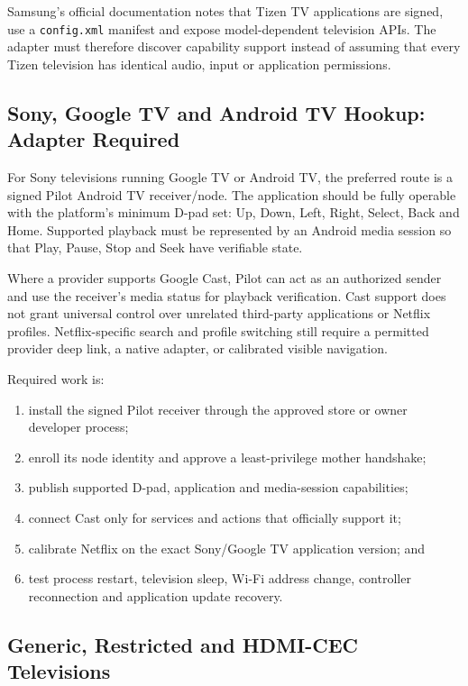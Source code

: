 Samsung's official documentation notes that Tizen TV applications are signed,
use a \texttt{config.xml} manifest and expose model-dependent television APIs.
The adapter must therefore discover capability support instead of assuming that
every Tizen television has identical audio, input or application permissions.

\subsection{Sony, Google TV and Android TV Hookup: Adapter Required}

For Sony televisions running Google TV or Android TV, the preferred route is a
signed Pilot Android TV receiver/node. The application should be fully operable
with the platform's minimum D-pad set: Up, Down, Left, Right, Select, Back and
Home. Supported playback must be represented by an Android media session so that
Play, Pause, Stop and Seek have verifiable state.

Where a provider supports Google Cast, Pilot can act as an authorized sender and
use the receiver's media status for playback verification. Cast support does not
grant universal control over unrelated third-party applications or Netflix
profiles. Netflix-specific search and profile switching still require a
permitted provider deep link, a native adapter, or calibrated visible navigation.

Required work is:

\begin{enumerate}
  \item install the signed Pilot receiver through the approved store or owner
        developer process;
  \item enroll its node identity and approve a least-privilege mother handshake;
  \item publish supported D-pad, application and media-session capabilities;
  \item connect Cast only for services and actions that officially support it;
  \item calibrate Netflix on the exact Sony/Google TV application version; and
  \item test process restart, television sleep, Wi-Fi address change, controller
        reconnection and application update recovery.
\end{enumerate}

\subsection{Generic, Restricted and HDMI-CEC Televisions}

